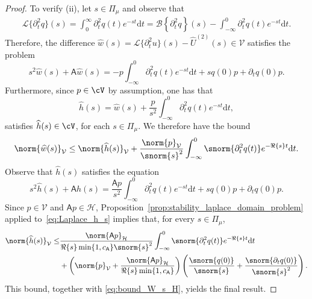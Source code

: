 \begin{proof}
To verify (ii), let $s\in\Pi_\mu$ and observe that
\begin{equation}
\begin{aligned}
	\mathcal{L}\{  \partial^2_t  q \}(s)
	=
	\int_{0}^{\infty}
	\partial^2_t  q (t)
	e^{-s t}
	\text{d} t
	=
	\mathcal{B}
	\left\{
		\partial^2_t  q 
	\right\}(s)
	-
	\int_{-\infty}^{0}
	\partial^2_t  q  (t)
	e^{-s t}
	\text{d} t.
\end{aligned}
\end{equation}
Therefore, the difference $\widehat{w}(s) = \mathcal{L}\{\partial^2_t u\}(s) -\widehat{U}^{(2)}(s) \in \mathcal{V} $ satisfies the problem 
\begin{equation}
	s^2 \widehat{w}(s)
	+
	\mathsf{A} \widehat{w}(s)
	=
    -
    p
	\int_{-\infty}^{0}
	\partial^2_t  q  (t)
	e^{-s t}
	\text{d} t
	+
	s q(0) p
	+
	\partial_t q(0) p.
\end{equation}
Furthermore, since $p\in\cV$ by assumption, one has that
\begin{equation}
	\widehat{h}(s) 
    =
    \widehat{w}(s)
    +
    \frac{p}{s^2}
	\int_{-\infty}^{0}
	\partial^2_t  q  (t)
	e^{-s t}
	\text{d} t,
\end{equation}
satisfies $\widehat{h}(s) \in\cV$, for each $s \in \Pi_\mu$.
We therefore have the bound
\begin{equation}\label{eq:bound_W_s_H}
    \norm{\widehat{w}(s)}_\mathcal{V}
    \leq
    \norm{\widehat{h}(s)}_\mathcal{V}
    +
    \frac{\norm{p}_\mathcal{V}}{\snorm{s}^2}
	\int_{-\infty}^{0}
	\snorm{\partial^2_t  q  (t)}
	e^{-\Re\{s\} t}
	\text{d} t.
\end{equation}
Observe that $\widehat{h}(s)$ satisfies the equation
\begin{equation}\label{eq:Laplace_h_s}
	s^2 \widehat{h}(s)
	+
	\mathsf{A} \widehat{h}(s)
	=
    \frac{\mathsf{A} p}{s^2}
	\int_{-\infty}^{0}
	\partial^2_t  q  (t)
	e^{-s t}
	\text{d} t
	+
	s q(0) p
	+
	\partial_t q(0) p.
\end{equation}
Since $p \in \mathcal{V}$ and $\mathsf{A}p \in \mathcal{H}$, Proposition~\ref{prop:stability_laplace_domain_problem}
applied to~\eqref{eq:Laplace_h_s} implies that, for every $s \in \Pi_\mu$,
\begin{equation}
\begin{aligned}
    \norm{\widehat{h}(s)}_\mathcal{V}
	\leq
	&
    \frac{
        \norm{\mathsf{A}p}_{\mathcal{H}}
    }{
        \Re\{s\}  \min\{1, c_{\mathsf{A}}\}
        \snorm{s}^2
    }
	\int_{-\infty}^{0}
	\snorm{\partial^2_t  q (t)}
	e^{-\Re\{s\} t}
	\text{d} t
	\\
	&
	+
	\left(
      	\norm{p}_{\mathcal{V}}
      	+
      	\frac{
			\norm{\mathsf{A}p}_{\mathcal{H}}
		}{
			\Re\{s\}  \min\{1, c_{\mathsf{A}}\}
		}
	\right)
	\left(
		\frac{\snorm{q(0)}}{\snorm{s}}
		+
		\frac{\snorm{\partial_t q(0)}}{\snorm{s}^2}
	\right).
\end{aligned}
\end{equation}
This bound, together with \eqref{eq:bound_W_s_H}, yields the final result. 



\end{proof}
